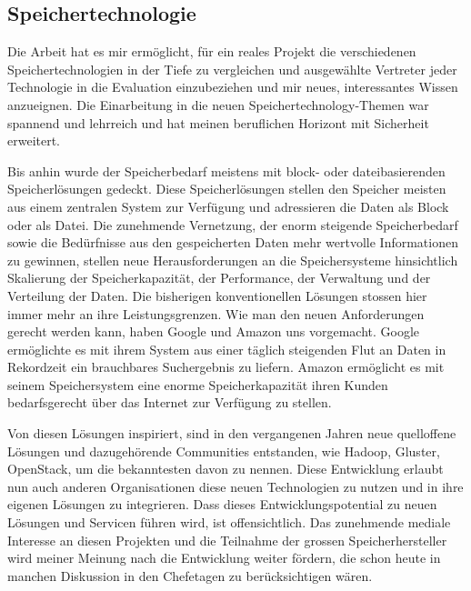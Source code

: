 \subsection{Speichertechnologie}
Die Arbeit hat es mir ermöglicht, für ein reales Projekt die verschiedenen Speichertechnologien in der Tiefe zu vergleichen und ausgewählte Vertreter jeder Technologie in die Evaluation einzubeziehen und mir neues, interessantes Wissen anzueignen. Die Einarbeitung in die neuen Speichertechnology-Themen war spannend und lehrreich und hat meinen beruflichen Horizont mit Sicherheit erweitert.

Bis anhin wurde der Speicherbedarf meistens mit block- oder dateibasierenden Speicherlösungen gedeckt. Diese Speicherlösungen stellen den Speicher meisten aus einem zentralen System zur Verfügung und adressieren die Daten als Block oder als Datei.
Die zunehmende Vernetzung, der enorm steigende Speicherbedarf sowie die Bedürfnisse aus den gespeicherten Daten mehr wertvolle Informationen zu gewinnen, stellen neue  Herausforderungen an die Speichersysteme hinsichtlich Skalierung der Speicherkapazität, der Performance, der Verwaltung und der Verteilung der Daten. Die bisherigen konventionellen Lösungen stossen hier immer mehr an ihre Leistungsgrenzen. Wie man den neuen Anforderungen gerecht werden kann, haben Google und Amazon uns vorgemacht. Google ermöglichte es mit ihrem System aus einer täglich steigenden Flut an Daten in Rekordzeit ein brauchbares Suchergebnis zu liefern. Amazon ermöglicht es mit seinem Speichersystem eine enorme Speicherkapazität ihren Kunden bedarfsgerecht über das Internet zur Verfügung zu stellen. 

Von diesen Lösungen inspiriert, sind in den vergangenen Jahren neue quelloffene Lösungen und dazugehörende Communities entstanden, wie Hadoop, Gluster, OpenStack, um die bekanntesten davon zu nennen. Diese Entwicklung erlaubt nun auch anderen Organisationen diese neuen Technologien zu nutzen und in ihre eigenen Lösungen zu integrieren. Dass dieses Entwicklungspotential zu neuen Lösungen und Servicen führen wird, ist offensichtlich. Das zunehmende mediale Interesse an diesen Projekten und die Teilnahme der grossen Speicherhersteller wird meiner Meinung nach die Entwicklung weiter fördern, die schon heute in manchen Diskussion in den Chefetagen zu berücksichtigen wären. 

